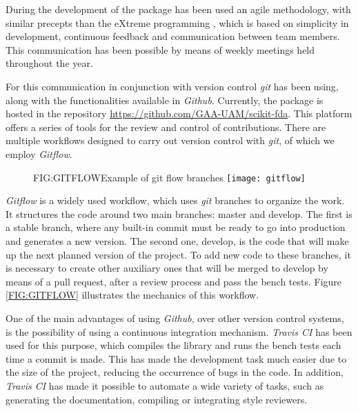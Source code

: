 During the development of the package has been used an agile methodology, with
similar precepts than the eXtreme programming \cite{eXtreme}, which is based on
simplicity in development, continuous feedback and communication between
team members. This communication has been possible by means of weekly meetings held throughout the year.

For this communication in conjunction with version control \textit{git} has been using,
along with the functionalities available in \textit{Github}. 
Currently, the package is hosted in the repository \href{https://github.com/GAA-UAM/scikit-fda}{https://github.com/GAA-UAM/scikit-fda}.
 This platform offers a
series of tools for the review and control of contributions. There are multiple
workflows designed to carry out version control with \textit{git}, of which we employ
\textit{Gitflow}.


\begin{figure}[Example of git flow branches]{FIG:GITFLOW}{Example of git flow branches \footnotemark}
	\texttt{[image: gitflow]}
\end{figure}

\textit{Gitflow} is a widely used workflow, which uses \textit{git} branches to organize the work.
It structures the code around two main branches: master and develop. The first
is a stable branch, where any built-in commit must be ready to go into
production and generates a new version. The second one, develop, is the code
that will make up the next planned version of the project. To add new code to
these branches, it is necessary to create other auxiliary ones that will be
merged to develop by means of a pull request, after a review process and pass
the bench tests. Figure \ref{FIG:GITFLOW} illustrates the mechanics of this
workflow.




One of the main advantages of using \textit{Github}, over other version control systems,
is the possibility of using a continuous integration mechanism. \textit{Travis CI} has
been used for this purpose, 
which compiles the library and runs the bench tests
each time a commit is made. This has made the development task much easier due to the size of the project, reducing the occurrence of bugs in the code.
In addition, \textit{Travis CI} has made it possible to automate a wide variety of tasks, such as generating the
documentation, compiling or integrating style reviewers.

